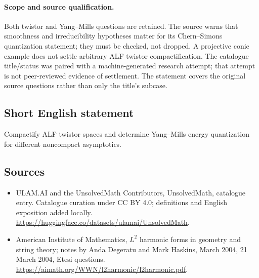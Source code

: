 \documentclass[11pt]{article}
\begin{document}
\paragraph{Scope and source qualification.}Both twistor and Yang–Mills questions are retained. The source warns that smoothness and irreducibility hypotheses matter for its Chern–Simons quantization statement; they must be checked, not dropped. A projective conic example does not settle arbitrary ALF twistor compactification. The catalogue title/status was paired with a machine-generated research attempt; that attempt is not peer-reviewed evidence of settlement. The statement covers the original source questions rather than only the title’s subcase.
\subsection{Short English statement}
Compactify ALF twistor spaces and determine Yang–Mills energy quantization for different noncompact asymptotics.
\subsection{Sources}
\begin{itemize}
\item[\hypertarget{source:statement:1}{S1}] ULAM.AI and the UnsolvedMath Contributors, UnsolvedMath, catalogue entry. Catalogue curation under CC BY 4.0; definitions and English exposition added locally.
\url{https://huggingface.co/datasets/ulamai/UnsolvedMath}.
\item[\hypertarget{source:statement:2}{S2}] American Institute of Mathematics, $L^2$ harmonic forms in geometry and string theory; notes by Anda Degeratu and Mark Haskins, March 2004, 21 March 2004, Etesi questions.
\url{https://aimath.org/WWN/l2harmonic/l2harmonic.pdf}.
\end{itemize}
\label{end:statement}
\end{document}
